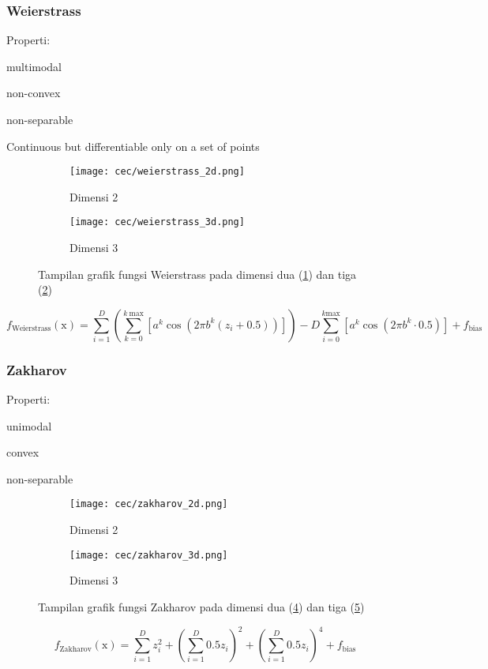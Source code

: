 \subsubsection*{Weierstrass}
\noindent Properti:
\begin{packed_item}
  \item multimodal
  \item non-convex
  \item non-separable
  \item Continuous but differentiable only on a set of points
\end{packed_item}
\begin{figure}[H]
	\centering
	\begin{subfigure}[b]{0.4\textwidth}
		\centering
		\texttt{[image: cec/weierstrass\_2d.png]}
		\caption{Dimensi 2}
		\label{fig:weierstrass-2d}
	\end{subfigure}
	\hfill
	\begin{subfigure}[b]{0.4\textwidth}
		\centering
		\texttt{[image: cec/weierstrass\_3d.png]}
		\caption{Dimensi 3}
		\label{fig:weierstrass-3d}
	\end{subfigure}
	\caption{Tampilan grafik fungsi Weierstrass pada dimensi dua (\cref{fig:weierstrass-2d}) dan tiga (\cref{fig:weierstrass-3d})}
	\label{fig:weierstrass}
\end{figure}
\begin{equation}
  f_{\text{Weierstrass}}(\mathrm{x})=\sum_{i=1}^{D}\left(\sum_{k=0}^{k\ \text{max}}\left[a^k\cos\left(2\pi b^k\left( z_i+0.5\right)  \right)  \right]  \right)-D\sum_{i=0}^{k \text{max}}\left[ a^k\cos\left(2\pi b^k\cdot0.5 \right) \right]  +f_{\text{bias}}
\end{equation}

\subsubsection*{Zakharov}
\noindent Properti:
\begin{packed_item}
  \item unimodal
  \item convex
  \item non-separable
\end{packed_item}
\begin{figure}[H]
	\centering
	\begin{subfigure}[b]{0.4\textwidth}
		\centering
		\texttt{[image: cec/zakharov\_2d.png]}
		\caption{Dimensi 2}
		\label{fig:zakharov-2d}
	\end{subfigure}
	\hfill
	\begin{subfigure}[b]{0.4\textwidth}
		\centering
		\texttt{[image: cec/zakharov\_3d.png]}
		\caption{Dimensi 3}
		\label{fig:zakharov-3d}
	\end{subfigure}
	\caption{Tampilan grafik fungsi Zakharov pada dimensi dua (\cref{fig:zakharov-2d}) dan tiga (\cref{fig:zakharov-3d})}
	\label{fig:zakharov}
\end{figure}
\begin{equation}
  f_{\text{Zakharov}}(\mathrm{x})=\sum_{i=1}^{D}z_i^2+\left(\sum_{i=1}^{D}0.5z_i \right)^2+\left(\sum_{i=1}^{D}0.5z_i \right)^4+f_{\text{bias}}
\end{equation}

